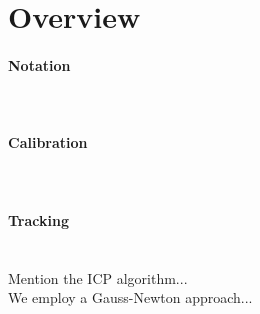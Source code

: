 \section{Overview}
\label{sec:overview}

\paragraph{Notation} \\

\paragraph{Calibration} \\

\paragraph{Tracking} \\
Mention the ICP algorithm... \\
We employ a Gauss-Newton approach... \\
